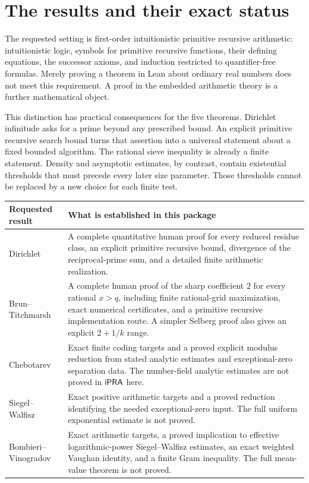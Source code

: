\section{The results and their exact status}

The requested setting is first-order intuitionistic primitive recursive arithmetic: intuitionistic logic, symbols for primitive recursive functions, their defining equations, the successor axioms, and induction restricted to quantifier-free formulas. Merely proving a theorem in Lean about ordinary real numbers does not meet this requirement. A proof in the embedded arithmetic theory is a further mathematical object.

This distinction has practical consequences for the five theorems. Dirichlet infinitude asks for a prime beyond any prescribed bound. An explicit primitive recursive search bound turns that assertion into a universal statement about a fixed bounded algorithm. The rational sieve inequality is already a finite statement. Density and asymptotic estimates, by contrast, contain existential thresholds that must precede every later size parameter. Those thresholds cannot be replaced by a new choice for each finite test.

\begin{center}
\begin{tabularx}{\textwidth}{@{}p{31mm}X@{}}
\toprule
Requested result & What is established in this package \\
\midrule
Dirichlet & A complete quantitative human proof for every reduced residue class, an explicit primitive recursive bound, divergence of the reciprocal-prime sum, and a detailed finite arithmetic realization. \\
Brun--Titchmarsh & A complete human proof of the sharp coefficient $2$ for every rational $x>q$, including finite rational-grid maximization, exact numerical certificates, and a primitive recursive implementation route. A simpler Selberg proof also gives an explicit $2+1/k$ range. \\
Chebotarev & Exact finite coding targets and a proved explicit modulus reduction from stated analytic estimates and exceptional-zero separation data. The number-field analytic estimates are not proved in $\mathsf{iPRA}$ here. \\
Siegel--Walfisz & Exact positive arithmetic targets and a proved reduction identifying the needed exceptional-zero input. The full uniform exponential estimate is not proved. \\
Bombieri--Vinogradov & Exact arithmetic targets, a proved implication to effective logarithmic-power Siegel--Walfisz estimates, an exact weighted Vaughan identity, and a finite Gram inequality. The full mean-value theorem is not proved. \\
\bottomrule
\end{tabularx}
\end{center}

